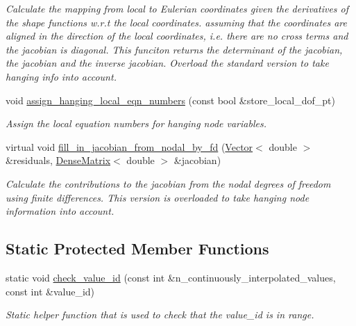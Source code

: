 \begin{DoxyCompactItemize}
\begin{DoxyCompactList}\small\item\em Calculate the mapping from local to Eulerian coordinates given the derivatives of the shape functions w.\+r.\+t the local coordinates. assuming that the coordinates are aligned in the direction of the local coordinates, i.\+e. there are no cross terms and the jacobian is diagonal. This funciton returns the determinant of the jacobian, the jacobian and the inverse jacobian. Overload the standard version to take hanging info into account. \end{DoxyCompactList}\item 
void \hyperlink{classoomph_1_1RefineableElement_a381592dd61261f9d5e0b2f88f799c3fc}{assign\+\_\+hanging\+\_\+local\+\_\+eqn\+\_\+numbers} (const bool \&store\+\_\+local\+\_\+dof\+\_\+pt)
\begin{DoxyCompactList}\small\item\em Assign the local equation numbers for hanging node variables. \end{DoxyCompactList}\item 
virtual void \hyperlink{classoomph_1_1RefineableElement_a83ff8606d2ccf11f7c70a95991cd50d5}{fill\+\_\+in\+\_\+jacobian\+\_\+from\+\_\+nodal\+\_\+by\+\_\+fd} (\hyperlink{classoomph_1_1Vector}{Vector}$<$ double $>$ \&residuals, \hyperlink{classoomph_1_1DenseMatrix}{Dense\+Matrix}$<$ double $>$ \&jacobian)
\begin{DoxyCompactList}\small\item\em Calculate the contributions to the jacobian from the nodal degrees of freedom using finite differences. This version is overloaded to take hanging node information into account. \end{DoxyCompactList}\end{DoxyCompactItemize}
\subsection*{Static Protected Member Functions}
\begin{DoxyCompactItemize}
\item 
static void \hyperlink{classoomph_1_1RefineableElement_a6d48d9a4d43fbd7f089b17dc8cf4fc1d}{check\+\_\+value\+\_\+id} (const int \&n\+\_\+continuously\+\_\+interpolated\+\_\+values, const int \&value\+\_\+id)
\begin{DoxyCompactList}\small\item\em Static helper function that is used to check that the value\+\_\+id is in range. \end{DoxyCompactList}\end{DoxyCompactItemize}
